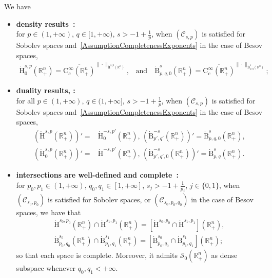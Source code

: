 \documentclass[AHL,Unicode,longabstracts,published]{cedram}
\newcommand{\bbR}{\mathbb{R}}
\newcommand{\rmH}{\mathrm{H}}%
\newcommand{\rmB}{\mathrm{B}}
\newcommand{\rmC}{\mathrm{C}}
\newcommand{\clC}{\mathcal{C}}
\newcommand{\clS}{\mathcal{S}}
\begin{document}
We have
\begin{itemize}
\item \textbf{density results~\cite[Proposition~3.9, Corollary~3.12]{Gaudin2022}:}\\
for $p\in(1,+\infty)$, $q\in[1,+\infty)$, $s>-1+\frac{1}{p}$, when $(\clC_{s,p})$ is satisfied for Sobolev spaces and~\eqref{AssumptionCompletenessExponents} in the case of Besov spaces,
\begin{align}
\dot{\rmH}^{s,p}_0\left(\bbR^n_+\right)= \overline{\rmC _c^\infty\left(\bbR^n_+\right)}^{\| \cdot \|_{\dot{\rmH}^{s,p}\left(\bbR^n\right)}}\text{,}\quad\text{and}\quad \dot{\rmB}^{s}_{p,q,0}\left(\bbR^n_+\right)= \overline{\rmC _c^\infty\left(\bbR^n_+\right)}^{\| \cdot \|_{\dot{\rmB}^{s}_{p,q}\left(\bbR^n\right)}};
\end{align}
\item \textbf{duality results, \cite[Propositions~3.11~\&~3.23]{Gaudin2022}:}\\
for all $p\in(1,+\infty)$, $q\in(1,+\infty]$, $s>-1+\tfrac{1}{p}$, when $(\clC_{s,p})$ is satisfied for Sobolev spaces and~\eqref{AssumptionCompletenessExponents} in the case of Besov spaces,
\begin{align}
\left(\dot{\rmH}^{s,p}\left(\bbR^n_+\right)\right)' = &\dot{\rmH}^{-s,p'}_0\left(\bbR^n_+\right),\, \left(\dot{\rmB}^{-s}_{p',q'}\left(\bbR^n_+\right)\right)'=\dot{\rmB}^{s}_{p,q,0}\left(\bbR^n_+\right),\\
\left(\dot{\rmH}^{s,p}_0\left(\bbR^n_+\right)\right)' = &\dot{\rmH}^{-s,p'}\left(\bbR^n_+\right),\,\left(\dot{\rmB}^{-s}_{p',q',0}\left(\bbR^n_+\right)\right)'=\dot{\rmB}^{s}_{p,q}\left(\bbR^n_+\right).
\end{align}
\item \textbf{intersections are well-defined and complete~\cite[Lemma~2.5, Proposition~3.3, Proposition~3.20]{Gaudin2022}:}\\
for $p_0,p_1\in(1,+\infty)$, $q_0,q_1\in[1,+\infty]$, $s_j>-1+\frac{1}{p_j}$, $j\in\{0,1\}$, when $(\clC_{s_0,p_0})$ is satisfied for Sobolev spaces, or $(\clC_{s_0,p_0,q_0})$ in the case of Besov spaces, we have that
\begin{align}
\dot{\rmH}^{s_0,p_0}\left(\bbR^n_+\right)\cap\dot{\rmH}^{s_1,p_1}\left(\bbR^n_+\right)= [\dot{\rmH}^{s_0,p_0}\cap\dot{\rmH}^{s_1,p_1}]\left(\bbR^n_+\right),\\
\dot{\rmB}^{s_0}_{p_0,q_0}\left(\bbR^n_+\right)\cap\dot{\rmB}^{s_1}_{p_1,q_1}\left(\bbR^n_+\right) = \left[\dot{\rmB}^{s_0}_{p_0,q_0}\cap\dot{\rmB}^{s_1}_{p_1,q_1}\right]\left(\bbR^n_+\right);
\end{align}
so that each space is complete. Moreover, it admits $\clS_0(\overline{\bbR^n_+})$ as dense subspace whenever $q_0,q_1<+\infty$.


\end{itemize}
\end{document}
